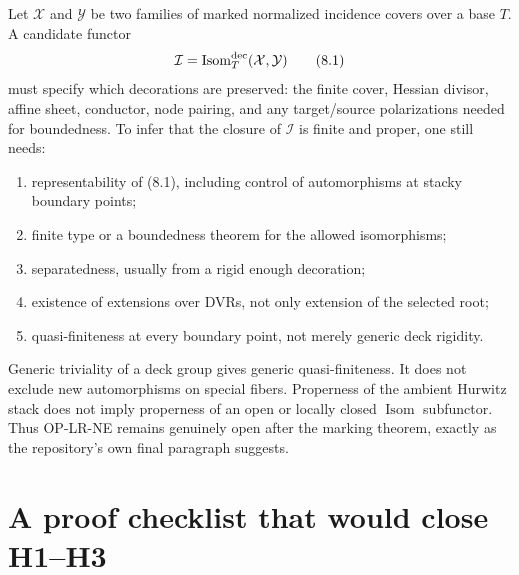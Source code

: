 \documentclass[11pt]{article}
\newcommand{\Isom}{\operatorname{Isom}}
\begin{document}
Let $\mathcal X$ and $\mathcal Y$ be two families of marked normalized
incidence covers over a base $T$.  A candidate functor
\[
 \mathcal I=\Isom_T^{\rm dec}(\mathcal X,\mathcal Y)                 \tag{8.1}
\]
must specify which decorations are preserved: the finite cover, Hessian
divisor, affine sheet, conductor, node pairing, and any target/source
polarizations needed for boundedness.  To infer that the closure of
$\mathcal I$ is finite and proper, one still needs:
\begin{enumerate}
\item representability of (8.1), including control of automorphisms at
stacky boundary points;
\item finite type or a boundedness theorem for the allowed isomorphisms;
\item separatedness, usually from a rigid enough decoration;
\item existence of extensions over DVRs, not only extension of the selected
root;
\item quasi-finiteness at every boundary point, not merely generic deck
rigidity.
\end{enumerate}
Generic triviality of a deck group gives generic quasi-finiteness.  It does
not exclude new automorphisms on special fibers.  Properness of the ambient
Hurwitz stack does not imply properness of an open or locally closed
$\Isom$ subfunctor.  Thus OP-LR-NE remains genuinely open after the marking
theorem, exactly as the repository's own final paragraph suggests.

\section{A proof checklist that would close H1--H3}
\end{document}
